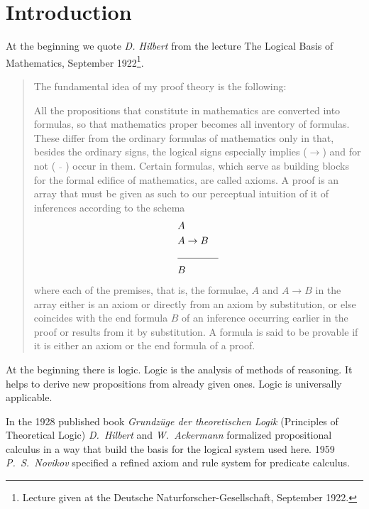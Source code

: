 \documentclass[a4paper,german,10pt,twoside]{book}
\theoremstyle{definition}
\theoremstyle{remark}
\begin{document}

\chapter*{Introduction} \label{chapter2} \hypertarget{chapter2}{}

At the beginning we quote \emph{D. Hilbert} from the lecture {\glqq The Logical Basis of Mathematics\grqq}, September 1922\footnote{Lecture given at the Deutsche Naturforscher-Gesellschaft, September 1922.}.

\par
\begin{quote} {
\glqq The fundamental idea of my proof theory is the following:

\par
All the propositions that constitute in mathematics are converted into formulas, so that mathematics proper becomes all inventory of formulas. These differ from the ordinary formulas of mathematics only in that, besides the ordinary signs, the logical signs
especially {\glqq implies\grqq} ($\rightarrow$) and for {\glqq not\grqq} 
($\bar{\quad}$) occur in them. 
Certain formulas, which serve as building blocks for the formal edifice of mathematics, are called axioms. A proof is an array that must be given as such to our perceptual intuition of it of inferences according to the schema\\
\begin{eqnarray*}
& A & \\
& A \rightarrow B& \\
\cline{2-3}
 & B &
\end{eqnarray*}
where each of the premises, that is, the formulae, $A$ and 
$A \rightarrow B$ in the array either is an axiom or directly from an axiom by substitution, or else coincides with the end formula $B$ of an inference occurring earlier in the proof or results from it by substitution. A formula is said to be provable if it is either an axiom or the end formula of a proof.\grqq}
\end{quote}

\par
At the beginning there is logic. Logic is the analysis of methods of reasoning. It helps to derive new propositions from already given ones. Logic is universally applicable.

\par
In the 1928 published book \emph{Grundz{\"u}ge der theoretischen Logik} (Principles of Theoretical Logic) \emph{D.~Hilbert} and \emph{W.~Ackermann} formalized propositional calculus in a way that build the basis for the logical system used here. 
1959 \emph{P.~S.~Novikov} specified a refined axiom and rule system for predicate calculus.
\end{document}
